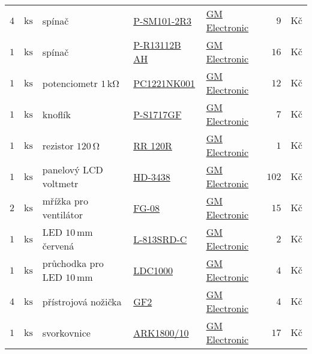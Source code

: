 \begin{table}[h]
\begin{tabular}[t]{|r@{$\,$}l|p{4.6cm}|p{4.2cm}|p{3.1cm}|r@{$\,$}l|}
		$ 4 $ & $\mathrm{ks} $ & spínač 													&	\href{http://www.gme.cz/cz/p-sm101-2r3-p624-252.html}{P-SM101-2R3}																	&	\href{http://www.gme.cz}{GM Electronic}										&	$ 9 $ & $\textrm{Kč} $	\\	
		$ 1 $ & $\mathrm{ks} $ & spínač 													&	\href{http://www.gme.cz/cz/p-r13112b-ah-p631-287.html}{P-R13112B AH}																&	\href{http://www.gme.cz}{GM Electronic}										&	$ 16 $ & $\textrm{Kč} $	\\	
		$ 1 $ & $\mathrm{ks} $ & potenciometr $ 1 \, \mathrm{k\Omega} $	&	\href{http://www.gme.cz/cz/-p113-125.html}{PC1221NK001}																			&	\href{http://www.gme.cz}{GM Electronic}										&	$ 12 $ & $\textrm{Kč} $	\\	
		$ 1 $ & $\mathrm{ks} $ & knoflík													&	\href{http://www.gme.cz/cz/-p624-196.html}{P-S1717GF}																								&	\href{http://www.gme.cz}{GM Electronic}										&	$ 7 $ & $\textrm{Kč} $	\\	
		$ 1 $ & $\mathrm{ks} $ & rezistor $ 120 \, \mathrm{\Omega} $	&	\href{http://www.gme.cz/cz/-p110-051.html}{RR 120R}																								&	\href{http://www.gme.cz}{GM Electronic}										&	$ 1 $ & $\textrm{Kč} $	\\	
		$ 1 $ & $\mathrm{ks} $ & panelový LCD voltmetr					 &	\href{http://www.gme.cz/cz/hd-3438-p722-197.html}{HD-3438}																						&	\href{http://www.gme.cz}{GM Electronic}										&	$ 102 $ & $\textrm{Kč} $	\\	
		$ 2 $ & $\mathrm{ks} $ & mřížka pro ventilátor						&	\href{http://www.gme.cz/cz/fg-08-p624-026.html}{FG-08}																									&	\href{http://www.gme.cz}{GM Electronic}										&	$ 15 $ & $\textrm{Kč} $	\\	
		$ 1 $ & $\mathrm{ks} $ & LED $ 10 \, \mathrm{mm} $ červená	&	\href{http://www.gme.cz/cz/l-813srd-c-p511-777.html}{L-813SRD-C}																		&	\href{http://www.gme.cz}{GM Electronic}										&	$ 2 $ & $\textrm{Kč} $	\\	
		$ 1 $ & $\mathrm{ks} $ & průchodka pro LED $ 10 \, \mathrm{mm} $	&	\href{http://www.gme.cz/cz/ldc1000-p624-306.html}{LDC1000}																		&	\href{http://www.gme.cz}{GM Electronic}										&	$ 4 $ & $\textrm{Kč} $	\\	
		$ 4 $ & $\mathrm{ks} $ & přístrojová nožička 							&	\href{http://www.gme.cz/cz/gf2-p623-037.html}{GF2}																											&	\href{http://www.gme.cz}{GM Electronic}										&	$ 4 $ & $\textrm{Kč} $	\\	
		$ 1 $ & $\mathrm{ks} $ & svorkovnice			 							&	\href{http://www.gme.cz/cz/ark1800-10-p821-155.html	}{ARK1800/10}																			&	\href{http://www.gme.cz}{GM Electronic}										&	$ 17 $ & $\textrm{Kč} $	\\	

\end{tabular}
\end{table}
